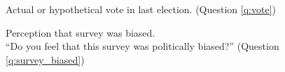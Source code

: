 \documentclass[12pt,english]{article}
\begin{document}




\begin{figure}[h!] 
    \caption[Actual or hypothetical vote in last election]{Actual or hypothetical vote in last election. (Question \ref{q:vote})}\label{fig:vote}
\end{figure}

\begin{figure}[h!] 
    \caption[Perception that survey was biased]{Perception that survey was biased. \\ ``Do you feel that this survey was politically biased?'' (Question \ref{q:survey_biased})}\label{fig:survey_biased}
\end{figure}
\end{document}
